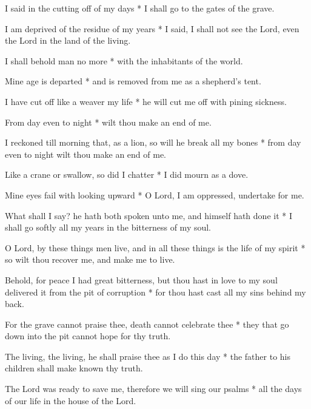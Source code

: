 I said in the cutting off of my days * I shall go to the gates of the grave.

I am deprived of the residue of my years * I said, I shall not see the Lord, even the Lord in the land of the living.

I shall behold man no more * with the inhabitants of the world.

Mine age is departed * and is removed from me as a shepherd's tent.

I have cut off like a weaver my life * he will cut me off with pining sickness.

From day even to night * wilt thou make an end of me.

I reckoned till morning that, as a lion, so will he break all my bones * from day even to night wilt thou make an end of me.

Like a crane or swallow, so did I chatter * I did mourn as a dove.

Mine eyes fail with looking upward * O Lord, I am oppressed, undertake for me.

What shall I say? he hath both spoken unto me, and himself hath done it * I shall go softly all my years in the bitterness of my soul.

O Lord, by these things men live, and in all these things is the life of my spirit * so wilt thou recover me, and make me to live.

Behold, for peace I had great bitterness, but thou hast in love to my soul delivered it from the pit of corruption * for thou hast cast all my sins behind my back.

For the grave cannot praise thee, death cannot celebrate thee * they that go down into the pit cannot hope for thy truth.

The living, the living, he shall praise thee as I do this day * the father to his children shall make known thy truth.

The Lord was ready to save me, therefore we will sing our psalms * all the days of our life in the house of the Lord.